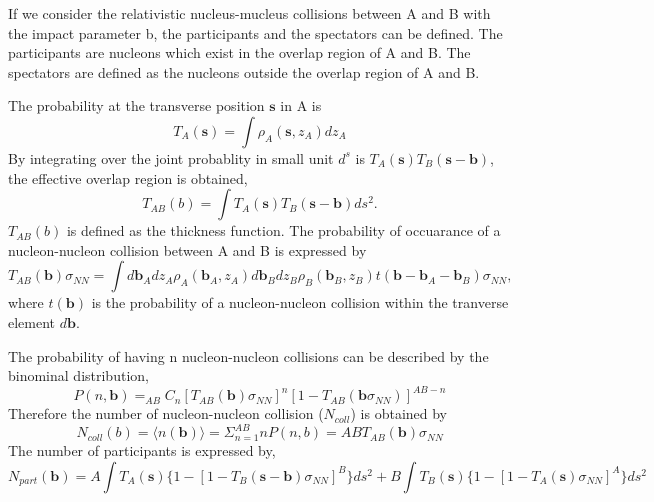 If we consider the relativistic nucleus-mucleus collisions between A and B with the impact parameter b, 
the participants and the spectators can be defined. 
The participants are nucleons which exist in the overlap region of A and B.
The spectators are defined as the nucleons outside the overlap region of A and B. 

The probability at the transverse position $\bm{s}$ in A is
\begin{equation}
        T_{A}(\bm{s}) = \int \rho_{A} (\bm{s}, z_{A})dz_{A}
\end{equation}
By integrating over the joint probablity in small unit $d^{s}$ is $T_{A}(\bm{s})T_{B}(\bm{s}-\bm{b})$, the effective overlap region is obtained,  
\begin{equation}
        T_{AB}(b) = \int T_{A}(\bm{s})T_{B}(\bm{s}-\bm{b})ds^{2}.
\end{equation}
$T_{AB}(b)$ is defined as the thickness function. 
The probability of occuarance of a nucleon-nucleon collision between A and B is expressed by
\begin{equation}
T_{AB} (\bm{b}) \sigma_{NN} = \int d\bm{b}_{A}dz_{A}\rho_{A}(\bm{b}_{A}, z_{A}) d\bm{b}_{B}dz_{B}\rho_{B}(\bm{b}_{B}, z_{B}) t(\bm{b}-\bm{b}_{A}-\bm{b}_{B})\sigma_{NN},
\end{equation}
where $t(\bm{b})$ is the probability of a nucleon-nucleon collision within the tranverse element $d\bm{b}$.

The probability of having n nucleon-nucleon collisions can be described by the binominal distribution, 
\begin{equation}
        P(n, \bm{b})= _{AB}C_{n}[T_{AB}(\bm{b})\sigma_{NN}]^{n}[1-T_{AB}(\bm{b}\sigma_{NN})]^{AB-n}
\end{equation}
Therefore the number of nucleon-nucleon collision ($N_{coll}$) is obtained by 
\begin{equation}
        N_{coll}(b) = \langle n(\bm{b}) \rangle= \Sigma_{n=1}^{AB} nP(n, b)= ABT_{AB}(\bm{b})\sigma_{NN}                
\end{equation}
The number of participants is expressed by, 
\begin{equation}
        N_{part}(\bm{b}) = A\int T_{A}(\bm{s})\{ 1-[1-T_{B}(\bm{s}-\bm{b})\sigma_{NN}]^{B} \}ds^{2} +
        B\int T_{B}(\bm{s})\{ 1-[1-T_{A}(\bm{s})\sigma_{NN}]^{A} \}ds^{2}                   
\end{equation}





